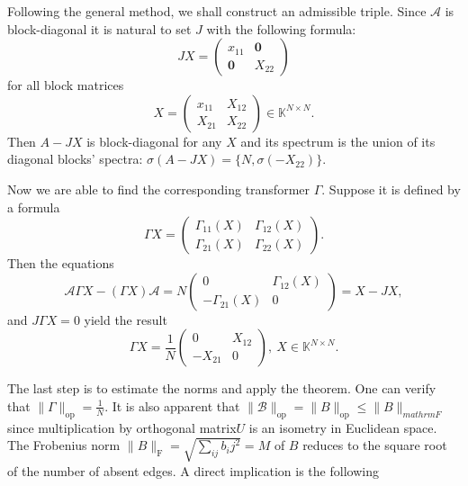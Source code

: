 \documentclass[a4paper]{jpconf}
\begin{document}
Following the general method, we shall construct an admissible triple.
Since \( \mathcal{A} \) is block-diagonal
    it is natural to set \( J \) with the following formula:
    \[
        JX =
        \left(\begin{array}{c|c}
            x_{11} & \mathbf{0} \\ \hline
            \mathbf{0} & X_{22}
        \end{array}\right)
    \]
    for all block matrices
    \[
        X =
        \left(\begin{array}{c|c}
            x_{11} & X_{12} \\ \hline
            X_{21} & X_{22}
        \end{array}\right)\in\mathbb{K}^{N{\times}N}.
    \]
Then \( A - JX \) is block-diagonal for any \( X \)
    and its spectrum is the union
    of its diagonal blocks' spectra:
    \( \sigma(A - JX) = \{N, \sigma(-X_{22}) \} \).

Now we are able to find the corresponding transformer \( \Gamma \).
Suppose it is defined by a formula
    \[ \Gamma X = \begin{pmatrix}
        \Gamma_{11}(X) & \Gamma_{12}(X) \\
        \Gamma_{21}(X) & \Gamma_{22}(X)
        \end{pmatrix}.
    \]
Then the equations
    \[
        \mathcal{A} \Gamma X - (\Gamma X)\mathcal{A} =
        N
        \begin{pmatrix}
          0 & \Gamma_{12}(X) \\
          -\Gamma_{21}(X) & 0
        \end{pmatrix} = X - JX,
     \]
and \( J\Gamma X = 0 \) yield the result
    \[
        \Gamma X = \frac{1}{N} \begin{pmatrix} 0 & X_{12} \\ -X_{21} & 0 \end{pmatrix},\ X\in\mathbb{K}^{N{\times}N}.
    \]

The last step is to estimate the norms and apply the theorem.
One can verify that \( \|\Gamma\|_{\mathrm{op}} = \frac1N \).
It is also apparent that \( \|\mathcal{B}\|_{\mathrm{op}} = \|B\|_{\mathrm{op}} \leq \|B\|_{mathrm{F}} \)
    since multiplication by orthogonal matrix\( U \) is an isometry in Euclidean space.
The Frobenius norm \( {\|B\|_{\mathrm{F}} = \sqrt{\sum_{ij} b_ij^2} = M} \)
    of \( B \)
    reduces to the square root of the number of absent edges.
A direct implication is the following
\end{document}
